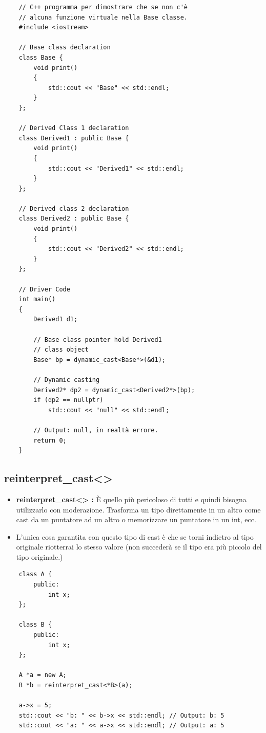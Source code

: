 \begin{lstlisting}
	// C++ programma per dimostrare che se non c'è
	// alcuna funzione virtuale nella Base classe.
	#include <iostream>
	
	// Base class declaration
	class Base {
		void print()
		{
			std::cout << "Base" << std::endl;
		}
	};
	
	// Derived Class 1 declaration
	class Derived1 : public Base {
		void print()
		{
			std::cout << "Derived1" << std::endl;
		}
	};
	
	// Derived class 2 declaration
	class Derived2 : public Base {
		void print()
		{
			std::cout << "Derived2" << std::endl;
		}
	};
	
	// Driver Code
	int main()
	{
		Derived1 d1;
		
		// Base class pointer hold Derived1
		// class object
		Base* bp = dynamic_cast<Base*>(&d1);
		
		// Dynamic casting
		Derived2* dp2 = dynamic_cast<Derived2*>(bp);
		if (dp2 == nullptr)
			std::cout << "null" << std::endl;
			
		// Output: null, in realtà errore.
		return 0;
	}
\end{lstlisting}

\subsection{reinterpret\_cast<>}

\begin{itemize}
	\item \textsf{\small \textbf{reinterpret\_cast<> :} È quello più pericoloso di tutti e quindi bisogna utilizzarlo con moderazione. Trasforma un tipo direttamente in un altro come cast da un puntatore ad un altro o memorizzare un puntatore in un int, ecc.}
	\item \textsf{\small L'unica cosa garantita con questo tipo di cast è che se torni indietro al tipo originale riotterrai lo stesso valore (non succederà se il tipo era più piccolo del tipo originale.)}
\end{itemize}

\begin{lstlisting}
	class A {
		public:
			int x;
	};

	class B {
		public:
			int x;
	};

	A *a = new A;
	B *b = reinterpret_cast<*B>(a);
	
	a->x = 5;
	std::cout << "b: " << b->x << std::endl; // Output: b: 5
	std::cout << "a: " << a->x << std::endl; // Output: a: 5
\end{lstlisting}

